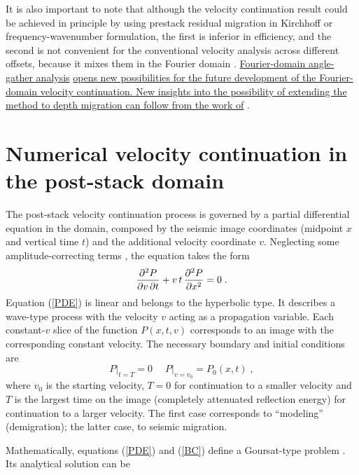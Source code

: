It is also important to note that although the velocity continuation result
could be achieved in principle by using prestack residual migration in
Kirchhoff \cite{Etgen.sepphd.68} or frequency-wavenumber
\cite{GEO61-02-06050607} formulation, the first is inferior in efficiency, and
the second is not convenient for the conventional velocity analysis across
different offsets, because it mixes them in the Fourier domain
\cite{SEG-2000-09920995}.  \uline{Fourier-domain angle-gather analysis}
\cite{SEG-2001-02960299,sandf} \uline{opens new possibilities for the future
development of the Fourier-domain velocity continuation. New insights into the
possibility of extending the method to depth migration can follow from the
work of} .

\section{Numerical velocity continuation in the post-stack domain}
\par
The post-stack velocity continuation process is governed by a partial
differential equation in the domain, composed by the seismic image
coordinates (midpoint $x$ and vertical time $t$) and the additional
velocity coordinate $v$. Neglecting some amplitude-correcting terms
\cite{first}, the equation takes the form
\cite{Claerbout.sep.48.79}
\begin{equation}
  \label{PDE}
  {{\partial^2 P} \over {\partial v\, \partial t}} +
  v\,t\,{{\partial^2 P} \over {\partial x^2}} = 0\;.
\end{equation}
Equation (\ref{PDE}) is linear and belongs to the hyperbolic type. It
describes a wave-type process with the velocity $v$ acting as a
propagation variable. Each constant-$v$ slice of the function
$P(x,t,v)$ corresponds to an image with the corresponding constant
velocity. The necessary boundary and initial conditions are 
\begin{equation}
  \label{BC}
  \left.P\right|_{t=T} = 0\;\quad \left.P\right|_{v=v_0} = P_0 (x,t)\;,
\end{equation}
where $v_0$ is the starting velocity, $T=0$ for continuation to a smaller
velocity and $T$ is the largest time on the image (completely attenuated
reflection energy) for continuation to a larger velocity.  The first case
corresponds to ``modeling'' (demigration); the latter case, to seismic
migration.
\par
Mathematically, equations (\ref{PDE}) and (\ref{BC}) define a
Goursat-type problem \cite{kurant2}. Its analytical solution can be
